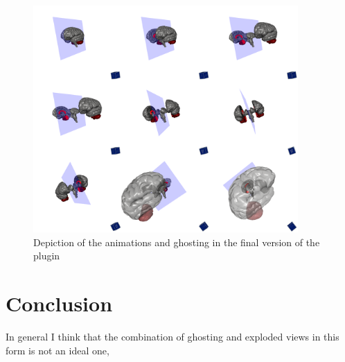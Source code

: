 \begin{figure}[tb]
	\centering
	\includegraphics[width=0.9\textwidth]{chapters/figures/brainstem}
	\caption{Depiction of the animations and ghosting in the final version of the plugin}
	\label{fig:brainstem}
\end{figure}
\chapter{Conclusion}
In general I think that the combination of ghosting and exploded views in this form is not an ideal one, 